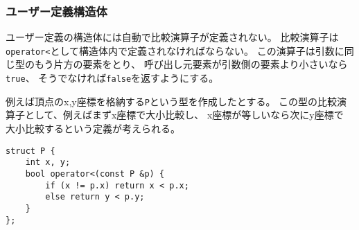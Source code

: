 \begin{comment}
\subsubsection{User-defined structs}

User-defined structs do not have a comparison
operator automatically.
The operator should be defined inside
the struct as a function
\texttt{operator<},
whose parameter is another element of the same type.
The operator should return \texttt{true}
if the element is smaller than the parameter,
and \texttt{false} otherwise.

For example, the following struct \texttt{P}
contains the x and y coordinates of a point.
The comparison operator is defined so that
the points are sorted primarily by the x coordinate
and secondarily by the y coordinate.
\end{comment}

\subsubsection{ユーザー定義構造体}

ユーザー定義の構造体には自動で比較演算子が定義されない。
比較演算子は\texttt{operator<}として構造体内で定義されなければならない。
この演算子は引数に同じ型のもう片方の要素をとり、
呼び出し元要素が引数側の要素より小さいなら\texttt{true}、
そうでなければ\texttt{false}を返すようにする。

例えば頂点のx,y座標を格納する\texttt{P}という型を作成したとする。
この型の比較演算子として、例えばまずx座標で大小比較し、
x座標が等しいなら次にy座標で
大小比較するという定義が考えられる。

\begin{lstlisting}
struct P {
    int x, y;
    bool operator<(const P &p) {
        if (x != p.x) return x < p.x;
        else return y < p.y;
    }
};
\end{lstlisting}

\begin{comment}
\subsubsection{Comparison functions}

\index{comparison function}

It is also possible to give an external
\key{comparison function} to the \texttt{sort} function
as a callback function.
For example, the following comparison function \texttt{comp}
sorts strings primarily by length and secondarily
by alphabetical order:
\end{comment}


